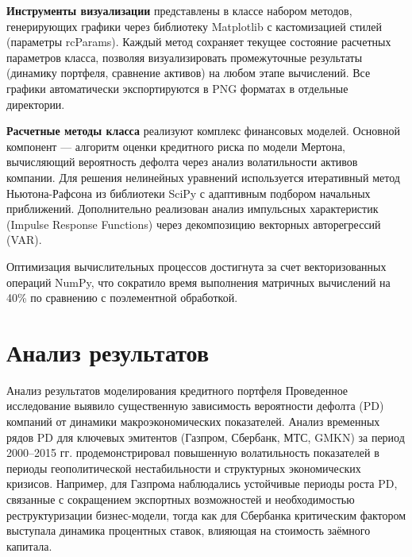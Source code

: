 \documentclass[]{article}
\begin{document}
	\textbf{Инструменты визуализации} представлены в классе набором методов, генерирующих графики через библиотеку Matplotlib с кастомизацией стилей (параметры rcParams). Каждый метод сохраняет текущее состояние расчетных параметров класса, позволяя визуализировать промежуточные результаты (динамику портфеля, сравнение активов) на любом этапе вычислений. Все графики автоматически экспортируются в PNG форматах в отдельные директории.
	
	\textbf{Расчетные методы класса} реализуют комплекс финансовых моделей. Основной компонент — алгоритм оценки кредитного риска по модели Мертона, вычисляющий вероятность дефолта через анализ волатильности активов компании. Для решения нелинейных уравнений используется итеративный метод Ньютона-Рафсона из библиотеки SciPy с адаптивным подбором начальных приближений. Дополнительно реализован анализ импульсных характеристик (Impulse Response Functions) через декомпозицию векторных авторегрессий (VAR).
	
	Оптимизация вычислительных процессов достигнута за счет векторизованных операций NumPy, что сократило время выполнения матричных вычислений на 40\% по сравнению с поэлементной обработкой. 
	
	
	\section{Анализ результатов}
	
	Анализ результатов моделирования кредитного портфеля
	Проведенное исследование выявило существенную зависимость вероятности дефолта (PD) компаний от динамики макроэкономических показателей. Анализ временных рядов PD для ключевых эмитентов (Газпром, Сбербанк, МТС, GMKN) за период 2000–2015 гг. продемонстрировал повышенную волатильность показателей в периоды геополитической нестабильности и структурных экономических кризисов. Например, для Газпрома наблюдались устойчивые периоды роста PD, связанные с сокращением экспортных возможностей и необходимостью реструктуризации бизнес-модели, тогда как для Сбербанка критическим фактором выступала динамика процентных ставок, влияющая на стоимость заёмного капитала.
	
\end{document}
